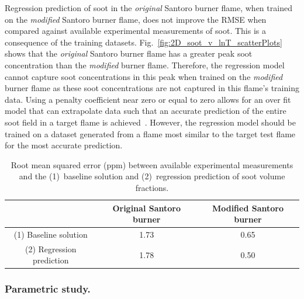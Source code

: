 \documentclass[12pt]{CHT-20}
\begin{document}
Regression prediction of soot in the \emph{original} Santoro burner flame, when trained on the \emph{modified} Santoro burner flame, does not improve the RMSE when compared against available experimental measurements of soot. This is a consequence of the training datasets. Fig.~\ref{fig:2D_soot_v_lnT_scatterPlots} shows that the \emph{original} Santoro burner flame has a greater peak soot concentration than the \emph{modified} burner flame. %
Therefore, the regression model cannot capture soot concentrations in this peak when trained on the \emph{modified} burner flame as these soot concentrations are not captured in this flame's training data. Using a penalty coefficient near zero or equal to zero allows for an over fit model that can extrapolate data such that an accurate prediction of the entire soot field in a target flame is achieved~\citep[]{Squeo2021}. However, the regression model should be trained on a dataset generated from a flame most similar to the target test flame for the most accurate prediction. 

\begin{table}[!ht]
\centering
\captionsetup{justification=centering}
\caption{Root mean squared error (ppm) between available experimental measurements and the (1)~baseline solution and (2)~regression prediction of soot volume fractions.}
 \begin{tabular}{ c  c  c } 
   & \textbf{Original Santoro burner} & \textbf{Modified Santoro burner} \\
 \hline \hline
(1) Baseline solution & 1.73 & 0.65 \\ \hline
 
(2) Regression prediction & 1.78 & 0.50 \\ \hline

 \end{tabular}
\label{table:RMSE_exp_baseline_machLearn}
\end{table}





\subsubsection{Parametric study.} \label{sec:paramtericStudy}
\end{document}
